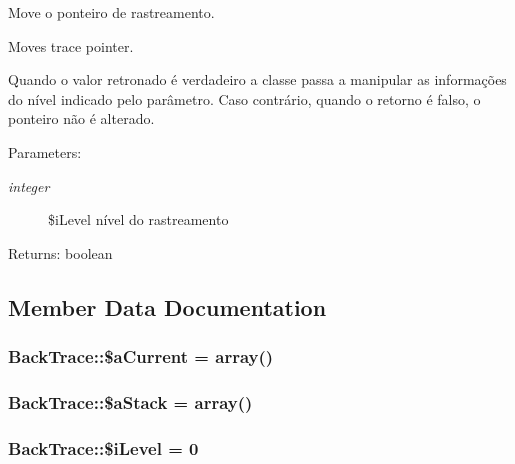 Move o ponteiro de rastreamento.

Moves trace pointer.

Quando o valor retronado é verdadeiro a classe passa a manipular as informações do nível indicado pelo parâmetro. Caso contrário, quando o retorno é falso, o ponteiro não é alterado.

\begin{Desc}
\item[Parameters:]
\begin{description}
\item[{\em integer}]\$iLevel nível do rastreamento \end{description}
\end{Desc}
\begin{Desc}
\item[Returns:]boolean \end{Desc}


\subsection{Member Data Documentation}
\hypertarget{class_back_trace_754eafcf5d553799f22808cf6f949bd7}{
\subsubsection[{\$aCurrent}]{\setlength{\rightskip}{0pt plus 5cm}BackTrace::\$aCurrent = array()}}
\label{class_back_trace_754eafcf5d553799f22808cf6f949bd7}


\hypertarget{class_back_trace_dd74bae86bc7427700c1c6f76864caf8}{
\subsubsection[{\$aStack}]{\setlength{\rightskip}{0pt plus 5cm}BackTrace::\$aStack = array()}}
\label{class_back_trace_dd74bae86bc7427700c1c6f76864caf8}


\hypertarget{class_back_trace_f53bd861302539bdcd96681d27501962}{
\subsubsection[{\$iLevel}]{\setlength{\rightskip}{0pt plus 5cm}BackTrace::\$iLevel = 0}}
\label{class_back_trace_f53bd861302539bdcd96681d27501962}


